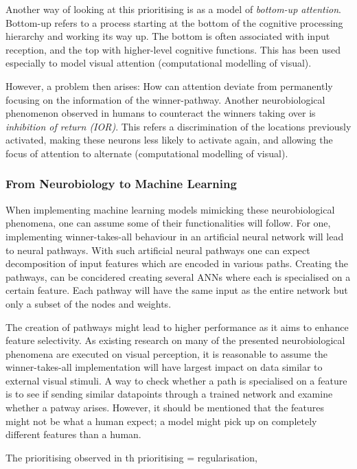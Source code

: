         Another way of looking at this prioritising is as a model of \textit{bottom-up attention}. Bottom-up refers to a process starting at the bottom of the cognitive processing hierarchy and working its way up. The bottom is often associated with input reception, and the top with higher-level cognitive functions. This has been used especially to model visual attention (computational modelling of visual). 

        However, a problem then arises: How can attention deviate from permanently focusing on the information of the  winner-pathway. Another neurobiological phenomenon observed in humans to counteract the winners taking over is \textit{inhibition of return (IOR)}. This refers a discrimination of the locations previously activated, making these neurons less likely to activate again, and allowing the focus of attention to alternate (computational modelling of visual).  

    \subsubsection{From Neurobiology to Machine Learning}
        When implementing machine learning models mimicking these neurobiological phenomena, one can assume some of their functionalities will follow. For one, implementing winner-takes-all behaviour in an artificial neural network will lead to neural pathways. With such artificial neural pathways one can expect decomposition of input features which are encoded in various paths. Creating the pathways, can be concidered creating several ANNs where each is specialised on a certain feature. Each pathway will have the same input as the entire network but only a subset of the nodes and weights.  
        
        The creation of pathways might lead to higher performance as it aims to enhance feature selectivity. As existing research on many of the presented neurobiological phenomena are executed on visual perception, it is reasonable to assume the winner-takes-all implementation will have largest impact on data similar to external visual stimuli. A way to check whether a path is specialised on a feature is to see if sending similar datapoints through a trained network and examine whether a patway arises. However, it should be mentioned that the features might not be what a human expect; a model might pick up on completely different features than a human.       

        The prioritising observed in th
        prioritising = regularisation,

